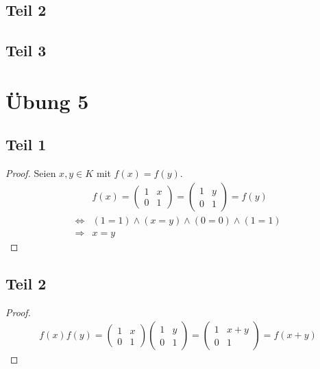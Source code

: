 \documentclass[a4paper,10pt]{article}
\begin{document}
\subsection*{Teil 2}

\subsection*{Teil 3}

\section*{Übung 5}

\subsection*{Teil 1}

\begin{proof}
 Seien $x, y \in K$ mit $f(x) = f(y)$.
 \begin{align}
  & f(x) = \begin{pmatrix}
        1 & x\\
        0 & 1
       \end{pmatrix}
        = \begin{pmatrix}
        1 & y\\
        0 & 1
       \end{pmatrix} = f(y)\\
  \Leftrightarrow & (1 = 1) \land (x = y) \land (0 = 0) \land (1 = 1)\\
  \Rightarrow & x = y
 \end{align}
\end{proof}

\subsection*{Teil 2}

\begin{proof}
 \begin{align}
  f(x)f(y) = \begin{pmatrix}
        1 & x\\
        0 & 1
       \end{pmatrix}
       \begin{pmatrix}
        1 & y\\
        0 & 1
       \end{pmatrix}
       = \begin{pmatrix}
        1 & x + y\\
        0 & 1
       \end{pmatrix} = f(x + y) 
 \end{align}
\end{proof}
\end{document}
